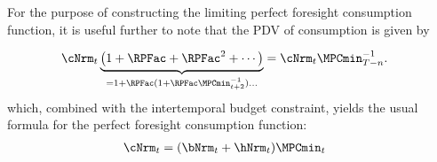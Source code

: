 \documentclass[\econtexRoot/BufferStockTheory]{subfiles}
\begin{document}
For the purpose of constructing the limiting perfect foresight consumption function, it is useful further to note that the PDV of consumption is given by\hypertarget{MPCnvrsIsCPDV}{}

\begin{eqnarray*}
  \cNrm_{t}\underbrace{\left(1 + \RPFac + \RPFac^{2} + \cdots \right)}_{=1+\RPFac(1+\RPFac\MPCmin_{t+2}^{-1})\ldots}   & = \cNrm_{t}\MPCmin_{T-n}^{-1}.
\end{eqnarray*}
which, combined with the intertemporal budget constraint, yields the usual formula for the perfect foresight consumption function:
\begin{equation}\begin{gathered}\begin{aligned}
  \cNrm_{t} & = (\bNrm_{t}+\hNrm_{t})\MPCmin_{t}
\end{aligned}\end{gathered}\end{equation}
\end{document}
